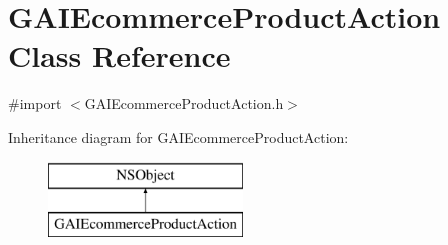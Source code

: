\hypertarget{interface_g_a_i_ecommerce_product_action}{}\section{G\+A\+I\+Ecommerce\+Product\+Action Class Reference}
\label{interface_g_a_i_ecommerce_product_action}


{\ttfamily \#import $<$G\+A\+I\+Ecommerce\+Product\+Action.\+h$>$}

Inheritance diagram for G\+A\+I\+Ecommerce\+Product\+Action\+:\begin{figure}[H]
\begin{center}
\leavevmode
\includegraphics[height=2.000000cm]{interface_g_a_i_ecommerce_product_action}
\end{center}
\end{figure}
